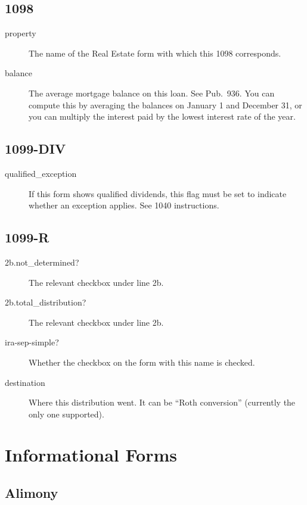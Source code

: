 \documentclass[12pt]{article}
\begin{document}
\subsection{1098}

\begin{description}
\item[property] The name of the Real Estate form with which this 1098
corresponds.
\item[balance] The average mortgage balance on this loan. See Pub.\ 936.
You can compute this by averaging the balances on January 1 and December 31, or
you can multiply the interest paid by the lowest interest rate of the year.
\end{description}

\subsection{1099-DIV}

\begin{description}
\item[qualified\_exception] If this form shows qualified dividends, this flag
must be set to indicate whether an exception applies. See 1040 instructions.
\end{description}


\subsection{1099-R}

\begin{description}
\item[2b.not\_determined?] The relevant checkbox under line 2b.
\item[2b.total\_distribution?] The relevant checkbox under line 2b.
\item[ira-sep-simple?] Whether the checkbox on the form with this name is
checked.
\item[destination] Where this distribution went. It can be ``Roth conversion''
(currently the only one supported).
\end{description}


\section{Informational Forms}



\subsection{Alimony}
\end{document}
